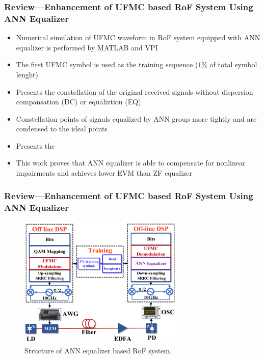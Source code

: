 \documentclass[t]{beamer}
\begin{document}
\begin{frame}
    \frametitle{Review---Enhancement of UFMC based RoF System Using ANN Equalizer~\cite{Liu2019}}
    \begin{itemize}
        \item Numerical simulation of UFMC waveform in RoF system equipped with ANN equalizer is performed by MATLAB and VPI
        \item The first UFMC symbol is used as the training sequence (\( 1\% \) of total symbol lenght)
        \item Presents the constellation of the original received signals without dispersion compansation (DC) or equaliztion (EQ)
        \item Constellation points of signals equalized by ANN group more tightly and are condensed to the ideal points
        \item Presents the 
        \item This work proves that ANN equalizer is able to compensate for nonlinear impairments and achieves lower EVM than ZF equalizer
    \end{itemize}
\end{frame}

\begin{frame}
    \frametitle{Review---Enhancement of UFMC based RoF System Using ANN Equalizer~\cite{Liu2019}}
    \begin{figure}
        \includegraphics[width=0.7\textwidth]{ANNEqualizer.PNG}
        \caption{Structure of ANN equalizer based RoF system.}
    \end{figure}
\end{frame}
\end{document}
